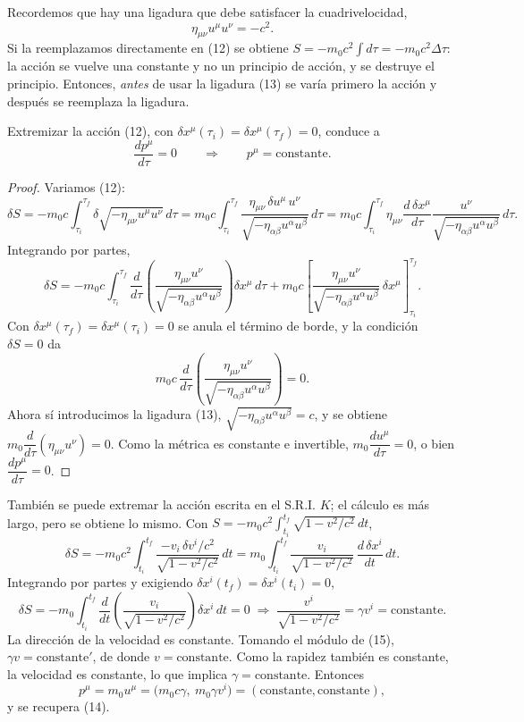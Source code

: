 Recordemos que hay una ligadura que debe satisfacer la cuadrivelocidad,
\[
\eta_{\mu\nu}u^\mu u^\nu = -c^2 . \tag{13}
\]
Si la reemplazamos directamente en (12) se obtiene
$S=-m_0c^2\int d\tau=-m_0c^2\Delta\tau$: la acción se vuelve una
constante y no un principio de acción, y se destruye el principio.
Entonces, \emph{antes} de usar la ligadura (13) se varía primero la
acción y después se reemplaza la ligadura.

\begin{proposicionc}
Extremizar la acción (12), con $\delta x^\mu(\tau_i)=\delta x^\mu
(\tau_f)=0$, conduce a
\[
\frac{dp^\mu}{d\tau}=0 \qquad\Longrightarrow\qquad p^\mu=\text{constante}.
\tag{14}
\]
\end{proposicionc}

\begin{proof}
Variamos (12):
\[
\delta S = -m_0c\int_{\tau_i}^{\tau_f}\delta\sqrt{-\eta_{\mu\nu}u^\mu
u^\nu}\,d\tau = m_0c\int_{\tau_i}^{\tau_f}\frac{\eta_{\mu\nu}\,
\delta u^\mu\,u^\nu}{\sqrt{-\eta_{\alpha\beta}u^\alpha u^\beta}}\,d\tau
= m_0c\int_{\tau_i}^{\tau_f}\eta_{\mu\nu}\frac{d\,\delta x^\mu}{d\tau}
\frac{u^\nu}{\sqrt{-\eta_{\alpha\beta}u^\alpha u^\beta}}\,d\tau .
\]
Integrando por partes,
\[
\delta S = -m_0c\int_{\tau_i}^{\tau_f}\frac{d}{d\tau}\left(\frac{\eta_{\mu
\nu}u^\nu}{\sqrt{-\eta_{\alpha\beta}u^\alpha u^\beta}}\right)\delta
x^\mu\,d\tau + m_0c\left[\frac{\eta_{\mu\nu}u^\nu}{\sqrt{-\eta_{\alpha
\beta}u^\alpha u^\beta}}\,\delta x^\mu\right]_{\tau_i}^{\tau_f}.
\]
Con $\delta x^\mu(\tau_f)=\delta x^\mu(\tau_i)=0$ se anula el término de
borde, y la condición $\delta S=0$ da
\[
m_0c\,\frac{d}{d\tau}\left(\frac{\eta_{\mu\nu}u^\nu}{\sqrt{-\eta_{\alpha
\beta}u^\alpha u^\beta}}\right)=0 .
\]
Ahora sí introducimos la ligadura (13), $\sqrt{-\eta_{\alpha\beta}
u^\alpha u^\beta}=c$, y se obtiene $m_0\dfrac{d}{d\tau}(\eta_{\mu\nu}
u^\nu)=0$. Como la métrica es constante e invertible, $m_0\dfrac{du^\mu}
{d\tau}=0$, o bien $\dfrac{dp^\mu}{d\tau}=0$. \qedhere
\end{proof}

También se puede extremar la acción escrita en el S.R.I. $K$; el cálculo
es más largo, pero se obtiene lo mismo. Con $S=-m_0c^2\int_{t_i}^{t_f}
\sqrt{1-v^2/c^2}\,dt$,
\[
\delta S = -m_0c^2\int_{t_i}^{t_f}\frac{-v_i\,\delta v^i/c^2}{\sqrt{1-
v^2/c^2}}\,dt = m_0\int_{t_i}^{t_f}\frac{v_i}{\sqrt{1-v^2/c^2}}\,
\frac{d\,\delta x^i}{dt}\,dt .
\]
Integrando por partes y exigiendo $\delta x^i(t_f)=\delta x^i(t_i)=0$,
\[
\delta S = -m_0\int_{t_i}^{t_f}\frac{d}{dt}\left(\frac{v_i}{\sqrt{1-v^2/
c^2}}\right)\delta x^i\,dt = 0 \;\Longrightarrow\; \frac{v^i}{\sqrt{1-v^2
/c^2}} = \gamma v^i=\text{constante}. \tag{15}
\]
La dirección de la velocidad es constante. Tomando el módulo de (15),
$\gamma v=\text{constante}'$, de donde $v=\text{constante}$. Como la
rapidez también es constante, la velocidad es constante, lo que implica
$\gamma=\text{constante}$. Entonces
\[
p^\mu = m_0u^\mu = \big(m_0c\gamma,\ m_0\gamma v^i\big) =
(\text{constante},\text{constante}),
\]
y se recupera (14).

